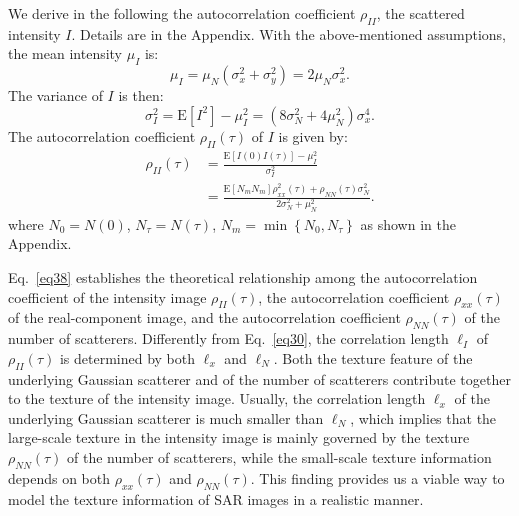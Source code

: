\documentclass[journal]{IEEEtran}
\begin{document}
We derive in the following the autocorrelation coefficient $\rho_{I I}$, the scattered intensity $I$.
Details are in the Appendix.
With the above-mentioned assumptions, the mean intensity $\mu_{I}$ is:
\begin{equation}
\mu_{I} = \mu_{N}(\sigma_{x}^{2}+\sigma_{y}^{2}) = 2 \mu_{N} \sigma_{x}^{2}.
\label{eq36}
\end{equation}
The variance of $I$ is then:
\begin{equation}
\sigma_{I}^{2}=\mathrm{E}\left[I^{2}\right]-\mu_{I}^{2}=\left(8 \sigma_{N}^{2}+4 \mu_{N}^{2}\right) \sigma_{x}^{4}.
\label{eq37}
\end{equation}
The autocorrelation coefficient $\rho_{I I}(\tau)$ of $I$ is given by:
\begin{align}
\rho_{I I}(\tau) & =\frac{\mathrm{E}[I(0) I(\tau)]-\mu_{I}^{2}}{\sigma_{I}^{2}} \nonumber\\
& = \frac{\mathrm{E}\left[N_{m} N_{m}\right] \rho_{x x}^{2}(\tau)+\rho_{N N}(\tau) \sigma_{N}^{2}}{2 \sigma_{N}^{2}+\mu_{N}^{2}}.
\label{eq38}
\end{align}
where $N_{0} = N(0)$, $N_{\tau} = N(\tau)$, $N_{m} = \min \left\{N_{0}, N_{\tau}\right\}$ as shown in the Appendix.

Eq.~\eqref{eq38} establishes the theoretical relationship among
the autocorrelation coefficient of the intensity image $\rho_{I I}(\tau)$,
the autocorrelation coefficient $\rho_{x x}(\tau)$ of the real-component image,
and the autocorrelation coefficient $\rho_{N N}(\tau)$ of the number of scatterers.
Differently from Eq.~\eqref{eq30},
the correlation length $\ell_{I}$ of $\rho_{I I}(\tau)$ is determined by both $\ell_x$ and $\ell_N$.
Both the texture feature of the underlying Gaussian scatterer and of the number of scatterers contribute together to the texture of the intensity image.
Usually, the correlation length $\ell_x$ of the underlying Gaussian scatterer is much smaller than $\ell_N$, which implies that the large-scale texture in the intensity image is mainly governed by the texture $\rho_{N N}(\tau)$ of the number of scatterers, while the small-scale texture information depends on both $\rho_{x x}(\tau)$ and $\rho_{N N}(\tau)$.
This finding provides us a viable way to model the texture information of SAR images in a realistic manner.
\end{document}
